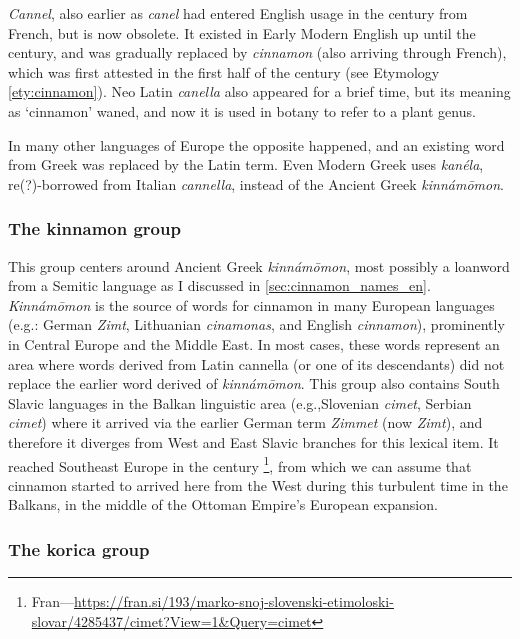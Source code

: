 \textit{\obs Cannel}, also earlier as \textit{canel} had entered English usage in the  century from French, but is now obsolete. It existed in Early Modern English up until the  century, and was gradually replaced by \textit{cinnamon} (also arriving through French), which was first attested in the first half of the  century (see Etymology \ref{ety:cinnamon}). Neo Latin \textit{canella} also appeared for a brief time, but its meaning as `cinnamon' waned, and now it is used in botany to refer to a plant genus.

In many other languages of Europe the opposite happened, and an existing word from Greek was replaced by the Latin term. Even Modern Greek uses \textit{kanéla}, re(?)-borrowed from Italian \textit{cannella}, instead of the Ancient Greek \textit{kinnámōmon}. 

\subsubsection{The kinnamon group}

This group centers around Ancient Greek \textit{kinnámōmon}, most possibly a loanword from a Semitic language as I discussed in \cref{sec:cinnamon_names_en}. \textit{Kinnámōmon} is the source of words for cinnamon in many European languages (e.g.: German \textit{Zimt}, Lithuanian \textit{cinamonas}, and English \textit{cinnamon}), prominently in Central Europe and the Middle East. In most cases, these words represent an area where words derived from Latin cannella (or one of its descendants) did not replace the earlier word derived of \textit{kinnámōmon}. This group also contains South Slavic languages in the Balkan linguistic area (e.g.,Slovenian \textit{cimet}, Serbian  \textit{cimet}) where it arrived via the earlier German term \textit{Zimmet} (now \textit{Zimt}), and therefore it diverges from West and East Slavic branches for this lexical item. It reached Southeast Europe in the  century \autocite[cimet]{snoj_slovenski_1997}\footnote{Fran---\url{https://fran.si/193/marko-snoj-slovenski-etimoloski-slovar/4285437/cimet?View=1\&Query=cimet}}, from which we can assume that cinnamon started to arrived here from the West during this turbulent time in the Balkans, in the middle of the Ottoman Empire's European expansion.

\subsubsection{The korica group}

